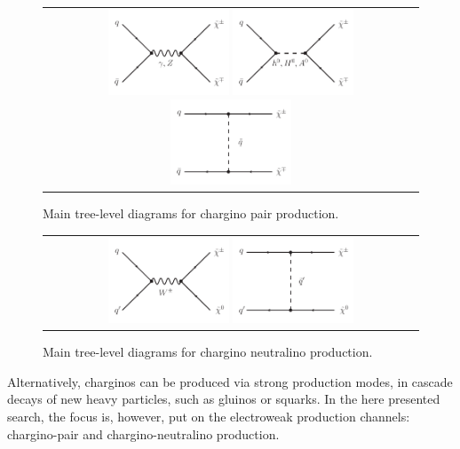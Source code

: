 \begin{figure}[!h]
  \centering 
  \begin{tabular}{c}
    \includegraphics[width=0.33\textwidth]{figures/analysis/ChiChi_GammaZ.pdf}
    \includegraphics[width=0.33\textwidth]{figures/analysis/ChiChi_Scalar.pdf}
    \includegraphics[width=0.33\textwidth]{figures/analysis/ChiChi_Squark.pdf}
  \end{tabular}
  \caption{Main tree-level diagrams for chargino pair production.}
  \label{fig:FeynmanDiagramProductionCharginoPair}
\end{figure}

\begin{figure}[!h]
  \centering 
  \begin{tabular}{c}
    \includegraphics[width=0.33\textwidth]{figures/analysis/ChiChi0_WBoson.pdf}
    \includegraphics[width=0.33\textwidth]{figures/analysis/ChiChi0_Squark.pdf}
  \end{tabular}
  \caption{Main tree-level diagrams for chargino neutralino production.}
  \label{fig:FeynmanDiagramProductionCharginoNeutralino}
\end{figure}
Alternatively, charginos can be produced via strong production modes, \ie in cascade decays of new heavy particles, such as gluinos or squarks.
In the here presented search, the focus is, however, put on the electroweak production channels: chargino-pair and chargino-neutralino production.\\


